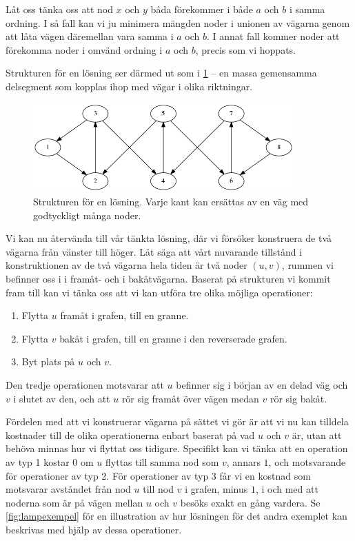 Låt oss tänka oss att nod $x$ och $y$ båda förekommer i både $a$ och $b$ i samma ordning.
I så fall kan vi ju minimera mängden noder i unionen av vägarna genom att låta vägen däremellan vara samma i $a$ och $b$.
I annat fall kommer noder att förekomma noder i omvänd ordning i $a$ och $b$, precis som vi hoppats.

Strukturen för en lösning ser därmed ut som i \ref{fig:lampstrukt} -- en massa gemensamma delsegment som kopplas ihop med vägar i olika riktningar.

\begin{figure}[!h]
\begin{center}
  \includegraphics[width=10cm]{lampstrukt.png}
  \caption{Strukturen för en lösning. Varje kant kan ersättas av en väg med godtyckligt många noder.}
  \label{fig:lampstrukt}
\end{center}
\end{figure}

Vi kan nu återvända till vår tänkta lösning, där vi försöker konstruera de två vägarna från vänster till höger.
Låt säga att vårt nuvarande tillstånd i konstruktionen av de två vägarna hela tiden är två noder $(u, v)$, rummen vi befinner oss i i framåt- och i bakåtvägarna.
Baserat på strukturen vi kommit fram till kan vi tänka oss att vi kan utföra tre olika möjliga operationer:
\begin{enumerate}
  \item Flytta $u$ framåt i grafen, till en granne.
  \item Flytta $v$ bakåt i grafen, till en granne i den reverserade grafen.
  \item Byt plats på $u$ och $v$.
\end{enumerate}

Den tredje operationen motsvarar att $u$ befinner sig i början av en delad väg och $v$ i slutet av den, och att $u$ rör sig framåt över vägen medan $v$ rör sig bakåt.

Fördelen med att vi konstruerar vägarna på sättet vi gör är att vi nu kan tilldela kostnader till de olika operationerna enbart baserat på vad $u$ och $v$ är, utan att behöva minnas hur vi flyttat oss tidigare.
Specifikt kan vi tänka att en operation av typ 1 kostar $0$ om $u$ flyttas till samma nod som $v$, annars $1$, och motsvarande för operationer av typ 2.
För operationer av typ 3 får vi en kostnad som motsvarar avståndet från nod $u$ till nod $v$ i grafen, minus $1$, i och med att noderna som är på vägen mellan $u$ och $v$ besöks exakt en gång vardera.
Se \ref{fig:lampexempel} för en illustration av hur lösningen för det andra exemplet kan beskrivas med hjälp av dessa operationer.

